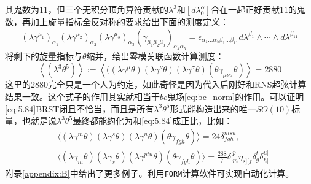 其鬼数为$11$，但三个无积分顶角算符贡献的$\lambda^3$和$[d\lambda_0^\alpha]$合在一起正好贡献$11$的鬼数，再加上旋量指标全反对称的要求给出下面的测度定义：
\begin{equation}
	[d\lambda^\alpha](\lambda\gamma^{\mu_1})_{\alpha_1}(\lambda\gamma^{\mu_2})_{\alpha_2}(\lambda\gamma^{\mu_3})_{\alpha_3}(\gamma_{\mu_1\mu_2\mu_3})_{\alpha_4\alpha_5}=\epsilon_{\alpha_1...\alpha_5\beta_1...\beta_{11}}d\lambda^{\beta_1}\wedge\cdots\wedge d\lambda^{\beta_{11}}
\end{equation}
将剩下的旋量指标与$\theta$缩并，给出零模关联函数计算测度：
\begin{equation}
	\label{eq:5.84}
	\boxed{
	\left\langle(\lambda^3\theta^5)\right\rangle:=\left\langle((\lambda\gamma^\mu\theta)(\lambda\gamma^\nu\theta)(\lambda\gamma^\sigma\theta)(\theta\gamma_{\mu\nu\sigma}\theta)\right\rangle = 2880
	}
\end{equation}
这里的$2880$完全只是一个人为约定，如此奇怪是因为代入后刚好和RNS超弦计算结果一致。这个式子的作用其实就相当于$bc$鬼场\ref{eq:bc_norm}的作用。可以证明\ref{eq:5.84}BRST闭且不恰当，而且是所有$\lambda^3\theta^5$形式能构造出来的唯一$SO(10)$标量，也就是说$\lambda^3\theta^5$最终都能约化为和\ref{eq:5.84}成正比，比如：
\begin{equation}
	\label{eq:5.85}
	\begin{aligned}
		&\langle(\lambda\gamma^m\theta)(\lambda\gamma^s\theta)(\lambda\gamma^u\theta)(\theta\gamma_{fgh}\theta)\rangle=24\delta_{fgh}^{msu},\\&\langle(\lambda\gamma_m\theta)(\lambda\gamma_s\theta)(\lambda\gamma^{ptu}\theta)(\theta\gamma_{fgh}\theta)\rangle=\frac{288}{7}\delta_{[m}^{[p}\eta_{s][f}\delta_g^t\delta_{h]}^{u]}
	\end{aligned}
\end{equation}
附录\ref{appendix:B}中给出了更多例子。利用\texttt{FORM}计算软件可实现自动化计算。\cite{Mafra:2010pn}


